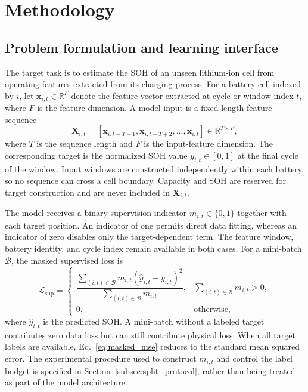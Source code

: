 \documentclass[a4paper,fleqn]{cas-dc}
\begin{document}
\section{Methodology}
\label{sec:methodology}

\subsection{Problem formulation and learning interface}
\label{subsec:problem_formulation}

The target task is to estimate the SOH of an unseen lithium-ion cell from operating features extracted from its charging process. For a battery cell indexed by $i$, let $\mathbf{x}_{i,t}\in\mathbb{R}^{F}$ denote the feature vector extracted at cycle or window index $t$, where $F$ is the feature dimension. A model input is a fixed-length feature sequence
\begin{equation}
\mathbf{X}_{i,t}=\left[\mathbf{x}_{i,t-T+1},\mathbf{x}_{i,t-T+2},\ldots,\mathbf{x}_{i,t}\right]\in\mathbb{R}^{T\times F},
\label{eq:input_sequence}
\end{equation}
where $T$ is the sequence length and $F$ is the input-feature dimension. The corresponding target is the normalized SOH value $y_{i,t}\in[0,1]$ at the final cycle of the window. Input windows are constructed independently within each battery, so no sequence can cross a cell boundary. Capacity and SOH are reserved for target construction and are never included in $\mathbf{X}_{i,t}$.

The model receives a binary supervision indicator $m_{i,t}\in\{0,1\}$ together with each target position. An indicator of one permits direct data fitting, whereas an indicator of zero disables only the target-dependent term. The feature window, battery identity, and cycle index remain available in both cases. For a mini-batch $\mathcal{B}$, the masked supervised loss is
\begin{equation}
\mathcal{L}_{\mathrm{sup}}=
\begin{cases}
\dfrac{\sum_{(i,t)\in\mathcal{B}} m_{i,t}\left(\hat{y}_{i,t}-y_{i,t}\right)^2}
{\sum_{(i,t)\in\mathcal{B}} m_{i,t}}, & \sum_{(i,t)\in\mathcal{B}}m_{i,t}>0,\\[6pt]
0, & \text{otherwise},
\end{cases}
\label{eq:masked_mse}
\end{equation}
where $\hat{y}_{i,t}$ is the predicted SOH. A mini-batch without a labeled target contributes zero data loss but can still contribute physical loss. When all target labels are available, Eq.~\eqref{eq:masked_mse} reduces to the standard mean squared error. The experimental procedure used to construct $m_{i,t}$ and control the label budget is specified in Section~\ref{subsec:split_protocol}, rather than being treated as part of the model architecture.
\end{document}
